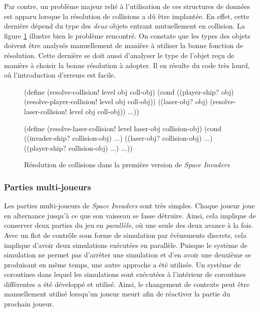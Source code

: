 \documentclass[12pt,twoside,letterpaper,francais]{book}
\begin{document}
Par contre, un problème majeur relié à l'utilisation de ces structures
de données est apparu lorsque la résolution de collisions a dû être
implantée. En effet, cette dernière dépend du type des \emph{deux}
objets entrant mutuellement en collision. La figure
\ref{Exp:si1-col-res} illustre bien le problème rencontré. On constate
que les types des objets doivent être analysés manuellement de manière
à utiliser la bonne fonction de résolution. Cette dernière se doit
aussi d'analyser le type de l'objet reçu de manière à choisir la bonne
résolution à adopter. Il en résulte du code très lourd, où
l'introduction d'erreurs est facile.\\

\begin{figure}[htb!]
  \begin{schemecode}
(define (resolve-collision! level obj coll-obj)
  (cond
   ((player-ship? obj) (resolve-player-collision! level obj coll-obj))
   ((laser-obj? obj) (resolve-laser-collision! level obj coll-obj))
   ...))

(define (resolve-laser-collision! level laser-obj collision-obj)
  (cond ((invader-ship? collision-obj) ...)
        ((laser-obj? collision-obj) ...)
        ((player-ship? collision-obj) ...)
        ...))
  \end{schemecode}
  \caption{Résolution de collisions dans la première version de \textit{Space Invaders}}
  \label{Exp:si1-col-res}
\end{figure}


\FloatBarrier
\subsubsection{Parties multi-joueurs}
Les parties multi-joueurs de \textit{Space Invaders} sont très
simples. Chaque joueur joue en alternance jusqu'à ce que son vaisseau
se fasse détruire. Ainsi, cela implique de conserver deux parties du
jeu en \emph{parallèle}, où une seule des deux avance à la fois. Avec
un flot de contrôle sous forme de simulation par évènements discrets,
cela implique d'avoir deux simulations exécutées en parallèle. Puisque
le système de simulation ne permet pas d'arrêter une simulation et
d'en avoir une deuxième se produisant en même temps, une autre
approche a été utilisée. Un système de coroutines dans lequel les
simulations sont exécutées à l'intérieur de coroutines différentes a
été développé et utilisé. Ainsi, le changement de contexte peut être
manuellement utilisé lorsqu'un joueur meurt afin de réactiver la
partie du prochain joueur.
\end{document}
